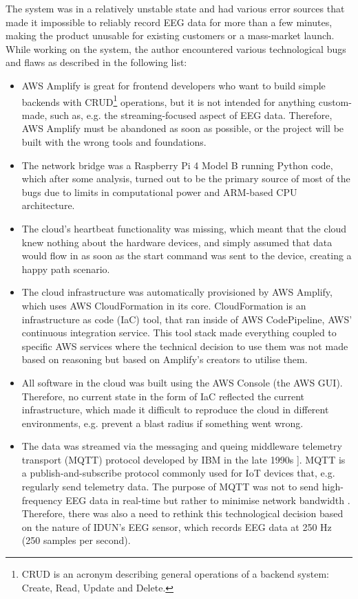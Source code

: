 The system was in a relatively unstable state and had various error sources that made it impossible to reliably record EEG data for more than a few minutes, making the product unusable for existing customers or a mass-market launch. While working on the system, the author encountered various technological bugs and flaws as described in the following list:

\begin{itemize}

  \item AWS Amplify is great for frontend developers who want to build simple backends with CRUD\footnote{CRUD is an acronym describing general operations of a backend system: Create, Read, Update and Delete.} operations, but it is not intended for anything custom-made, such as, e.g. the streaming-focused aspect of EEG data. Therefore, AWS Amplify must be abandoned as soon as possible, or the project will be built with the wrong tools and foundations.
  \item The network bridge was a Raspberry Pi 4 Model B running Python code, which after some analysis, turned out to be the primary source of most of the bugs due to limits in computational power and ARM-based CPU architecture.
  \item The cloud's heartbeat functionality was missing, which meant that the cloud knew nothing about the hardware devices, and simply assumed that data would flow in as soon as the start command was sent to the device, creating a happy path scenario.
  \item The cloud infrastructure was automatically provisioned by AWS Amplify, which uses AWS CloudFormation in its core. CloudFormation is an infrastructure as code (IaC) tool, that ran inside of AWS CodePipeline, AWS' continuous integration service. This tool stack made everything coupled to specific AWS services where the technical decision to use them was not made based on reasoning but based on Amplify's creators to utilise them.
  \item All software in the cloud was built using the AWS Console (the AWS GUI). Therefore, no current state in the form of IaC reflected the current infrastructure, which made it difficult to reproduce the cloud in different environments, e.g. prevent a blast radius if something went wrong.
  \item The data was streamed via the messaging and queing middleware telemetry transport (MQTT) protocol developed by IBM in the late 1990s ]\citep{yuan_getting_2017}. MQTT is a publish-and-subscribe protocol commonly used for IoT devices that, e.g. regularly send telemetry data. The purpose of MQTT was not to send high-frequency EEG data in real-time but rather to minimise network bandwidth \citep{mqtt_use_nodate}. Therefore, there was also a need to rethink this technological decision based on the nature of IDUN's EEG sensor, which records EEG data at 250 Hz (250 samples per second).

\end{itemize}
